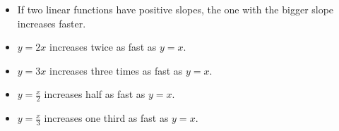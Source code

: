 \begin{frame}
\begin{itemize}
\item<1->  If two linear functions have positive slopes, the one with the bigger slope increases faster.
\item<2->  $y = 2x$ increases twice as fast as $y = x$.
\item<3->  $y = 3x$ increases three times as fast as $y = x$.
\item<4->  $y = \frac{x}{2}$ increases half as fast as $y = x$.
\item<5->  $y = \frac{x}{3}$ increases one third as fast as $y = x$.
\end{itemize}
\end{frame}

\begin{frame}
\ %
%
\end{frame}
